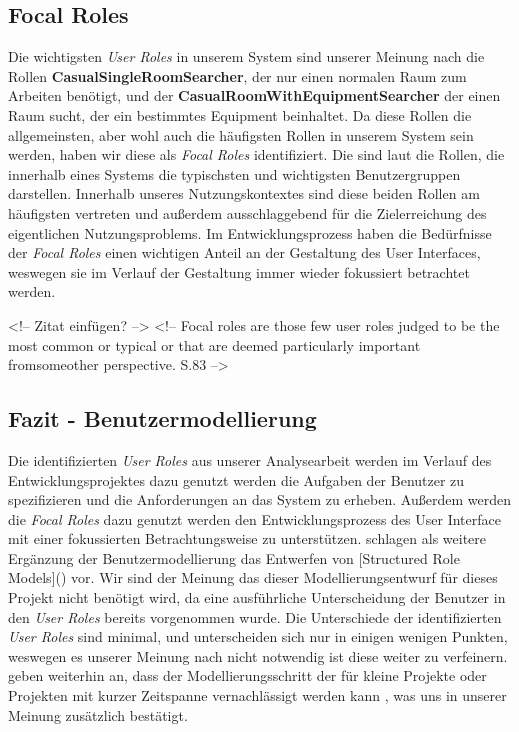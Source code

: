        
\subsection{Focal Roles}
\label{sec:Focal Roles}

Die wichtigsten \textit{User Roles} in unserem System sind unserer Meinung nach die
Rollen \textbf{CasualSingleRoomSearcher}, der nur einen normalen Raum zum
Arbeiten benötigt, und der \textbf{CasualRoomWithEquipmentSearcher} der einen
Raum sucht, der ein bestimmtes Equipment beinhaltet. Da diese Rollen die
allgemeinsten, aber wohl auch die häufigsten Rollen in unserem System sein
werden, haben wir diese als \textit{Focal Roles} identifiziert.
Die \citep{[Focal Roles](Buchverweis)} sind laut \textit{\citep{[Software For Use](Buch)}} die
Rollen, die innerhalb eines Systems die typischsten und wichtigsten
Benutzergruppen darstellen. Innerhalb unseres Nutzungskontextes sind diese
beiden Rollen am häufigsten vertreten und außerdem ausschlaggebend für die
Zielerreichung des eigentlichen Nutzungsproblems. Im Entwicklungsprozess haben
die Bedürfnisse der \textit{Focal Roles} einen wichtigen Anteil an der Gestaltung des
User Interfaces, weswegen sie im Verlauf der Gestaltung immer wieder fokussiert
betrachtet werden.

<!-- Zitat einfügen? -->
<!-- Focal roles are those few user roles judged to be the most common or typical or that are deemed particularly important fromsomeother perspective.
S.83
 -->

\subsection{Fazit - Benutzermodellierung}
\label{sec:Fazit - Benutzermodellierung}

Die identifizierten \textit{User Roles} aus unserer Analysearbeit werden im Verlauf
des Entwicklungsprojektes dazu genutzt werden die Aufgaben der Benutzer zu
spezifizieren und die Anforderungen an das System zu erheben.
Außerdem werden die \textit{Focal Roles} dazu genutzt werden den Entwicklungsprozess
des User Interface mit einer fokussierten Betrachtungsweise zu unterstützen.
\citep{[Constantine und Lockwood]()} schlagen als weitere Ergänzung der
Benutzermodellierung das Entwerfen von [Structured Role Models]() vor.
Wir sind der Meinung das dieser Modellierungsentwurf für dieses Projekt nicht
benötigt wird, da eine ausführliche Unterscheidung der Benutzer in den
\textit{User Roles} bereits vorgenommen wurde. Die Unterschiede der
identifizierten \textit{User Roles} sind minimal, und unterscheiden sich nur in
einigen wenigen Punkten, weswegen es unserer Meinung nach nicht notwendig ist
diese weiter zu verfeinern. \citep{[Constantine und Lockwood]()} geben weiterhin an,
dass der Modellierungsschritt der \citep{[Structured Role Models]()} für kleine
Projekte oder Projekten mit kurzer Zeitspanne vernachlässigt werden kann
\citep{[Zitat](S. 89, 2. Absatz, 3. Zeile)}, was uns in unserer Meinung zusätzlich bestätigt.



